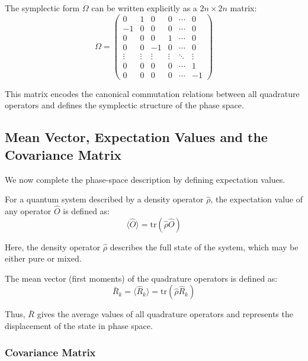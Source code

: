 The symplectic form $\Omega$ can be written explicitly as a $2n \times 2n$ matrix:
\begin{equation}
\Omega =
\begin{pmatrix}
0 & 1 & 0 & 0 & \cdots & 0 \\
-1 & 0 & 0 & 0 & \cdots & 0 \\
0 & 0 & 0 & 1 & \cdots & 0 \\
0 & 0 & -1 & 0 & \cdots & 0 \\
\vdots & \vdots & \vdots & \vdots & \ddots & \vdots \\
0 & 0 & 0 & 0 & \cdots & 1 \\
0 & 0 & 0 & 0 & \cdots & -1
\end{pmatrix}
\end{equation}

This matrix encodes the canonical commutation relations between all quadrature operators and defines the symplectic structure of the phase space.

\subsection{Mean Vector, Expectation Values and the Covariance Matrix}

We now complete the phase-space description by defining expectation values.

For a quantum system described by a density operator $\hat{\rho}$, the expectation value of any operator $\hat{O}$ is defined as:
\begin{equation}
\langle \hat{O} \rangle = \mathrm{tr}(\hat{\rho} \hat{O})
\end{equation}

Here, the density operator $\hat{\rho}$ describes the full state of the system, which may be either pure or mixed.

The mean vector (first moments) of the quadrature operators is defined as:
\begin{equation}
\bar{R}_k = \langle \hat{R}_k \rangle = \mathrm{tr}(\hat{\rho} \hat{R}_k)
\end{equation}

Thus, $\bar{R}$ gives the average values of all quadrature operators and represents the displacement of the state in phase space.

\subsubsection{Covariance Matrix}

